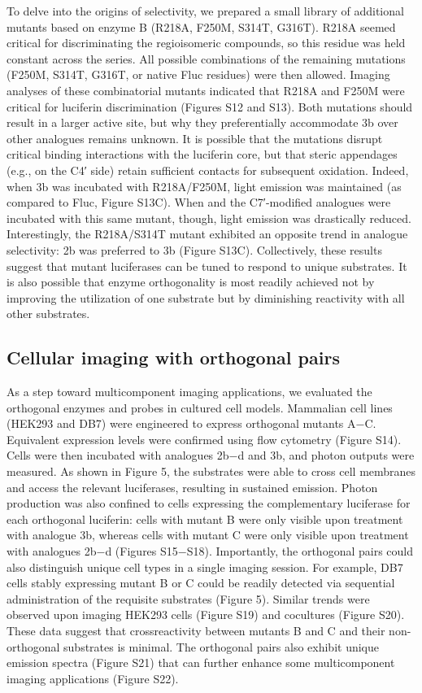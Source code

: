 To delve into the origins of selectivity, we prepared a small
library of additional mutants based on enzyme B (R218A,
F250M, S314T, G316T). R218A seemed critical for discriminating
the regioisomeric compounds, so this residue was held
constant across the series. All possible combinations of the
remaining mutations (F250M, S314T, G316T, or native Fluc
residues) were then allowed. Imaging analyses of these
combinatorial mutants indicated that R218A and F250M
were critical for luciferin discrimination (Figures S12 and
S13). Both mutations should result in a larger active site, but
why they preferentially accommodate 3b over other analogues
remains unknown. It is possible that the mutations disrupt
critical binding interactions with the luciferin core, but that
steric appendages (e.g., on the C4′ side) retain sufficient
contacts for subsequent oxidation. Indeed, when 3b was
incubated with R218A/F250M, light emission was maintained
(as compared to Fluc, Figure S13C). When \dluciferin{} and the
C7′-modified analogues were incubated with this same mutant,
though, light emission was drastically reduced. Interestingly, the
R218A/S314T mutant exhibited an opposite trend in analogue
selectivity: 2b was preferred to 3b (Figure S13C). Collectively,
these results suggest that mutant luciferases can be tuned to
respond to unique substrates. It is also possible that enzyme
orthogonality is most readily achieved not by improving the
utilization of one substrate but by diminishing reactivity with all
other substrates.

\subsection*{Cellular imaging with orthogonal pairs}

As a step
toward multicomponent imaging applications, we evaluated the
orthogonal enzymes and probes in cultured cell models.
Mammalian cell lines (HEK293 and DB7) were engineered
to express orthogonal mutants A−C. Equivalent expression
levels were confirmed using flow cytometry (Figure S14). Cells
were then incubated with analogues 2b−d and 3b, and photon
outputs were measured. As shown in Figure 5, the substrates
were able to cross cell membranes and access the relevant
luciferases, resulting in sustained emission. Photon production
was also confined to cells expressing the complementary
luciferase for each orthogonal luciferin: cells with mutant B
were only visible upon treatment with analogue 3b, whereas
cells with mutant C were only visible upon treatment with analogues 2b−d (Figures S15−S18). Importantly, the
orthogonal pairs could also distinguish unique cell types in a
single imaging session. For example, DB7 cells stably expressing
mutant B or C could be readily detected via sequential
administration of the requisite substrates (Figure 5). Similar
trends were observed upon imaging HEK293 cells (Figure S19)
and cocultures (Figure S20). These data suggest that crossreactivity
between mutants B and C and their non-orthogonal
substrates is minimal. The orthogonal pairs also exhibit unique
emission spectra (Figure S21) that can further enhance some
multicomponent imaging applications (Figure S22).

